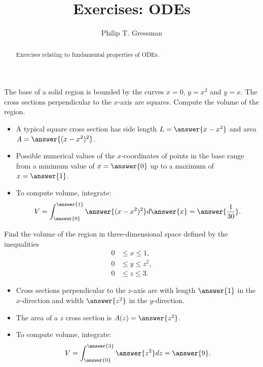 \documentclass{ximera}
\title{Exercises: ODEs}
\author{Philip T. Gressman}
\begin{document}
\begin{abstract}
Exercises relating to fundamental properties of ODEs.
\end{abstract}
\maketitle

\begin{exercise}
The base of a solid region is bounded by the curves $x = 0$, $y = x^2$ and $y = x$. The cross sections perpendicular to the $x$-axis are squares. Compute the volume of the region.
\begin{itemize}
\item A typical square cross section has side length $L = \answer{x - x^2}$ and area $A = \answer{(x-x^2)^2}$. 
\item Possible numerical values of the $x$-coordinates of points in the base range from a minimum value of $x = \answer{0}$ up to a maximum of $x = \answer{1}$.
\item To compute volume, integrate:
\[ V = \int_{\answer{0}}^{\answer{1}} \answer{(x-x^2)^2} d\answer{x} = \answer{\frac{1}{30}}. \]
\end{itemize}
\end{exercise}

\begin{exercise}
Find the volume of the region in three-dimensional space defined by the inequalities
\begin{align*}
0 & \leq x \leq 1, \\
0 & \leq y \leq z^2, \\
0 & \leq z \leq 3.
\end{align*}
\begin{itemize}
\item Cross sections perpendicular to the $z$-axis are  with length $\answer{1}$ in the $x$-direction and width $\answer{z^2}$ in the $y$-direction.
\item The area of a $z$ cross section is $A(z) = \answer{z^2}$.
\item To compute volume, integrate:
\[ V = \int_{\answer{0}}^{\answer{3}} \answer{z^2} dz = \answer{9}. \]
\end{itemize}
\end{exercise}
\end{document}
